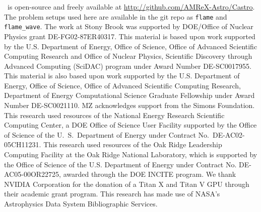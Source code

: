 \documentclass[preprint,times,tighten]{aastex63}
\newcommand{\castro}{{\sf Castro}}
\begin{document}
\acknowledgements \castro\ is open-source and freely available at
\url{http://github.com/AMReX-Astro/Castro}.  The problem setups used
here are available in the git repo as {\tt flame} and {\tt
  flame\_wave}.  The work at Stony Brook was supported by DOE/Office
of Nuclear Physics grant DE-FG02-87ER40317.  This material is based upon work supported by the
U.S. Department of Energy, Office of Science, Office of Advanced
Scientific Computing Research and Office of Nuclear Physics, Scientific
Discovery through Advanced Computing (SciDAC) program under Award
Number DE-SC0017955.  This material is also based upon work supported by the U.S. Department
of Energy, Office of Science, Office of Advanced Scientific Computing Research, Department of
Energy Computational Science Graduate Fellowship under Award Number DE-SC0021110.
MZ acknowledges support from the Simons Foundation. 
This research used resources of the National Energy
Research Scientific Computing Center, a DOE Office of Science User
Facility supported by the Office of Science of the U.~S.\ Department
of Energy under Contract No.\ DE-AC02-05CH11231.  This research used
resources of the Oak Ridge Leadership Computing Facility at the Oak
Ridge National Laboratory, which is supported by the Office of Science
of the U.S. Department of Energy under Contract No. DE-AC05-00OR22725,
awarded through the DOE INCITE program.  We thank NVIDIA Corporation
for the donation of a Titan X and Titan V GPU through their academic
grant program.  This research has made use of NASA's Astrophysics Data
System Bibliographic Services.








\end{document}
